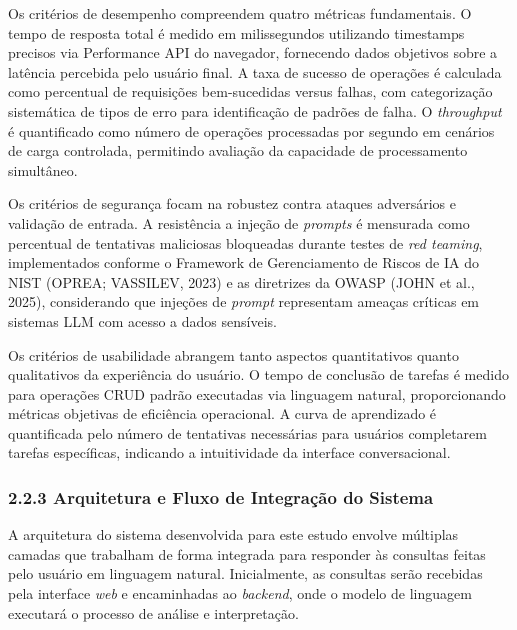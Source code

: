 \documentclass[
]{article}
\begin{document}
Os critérios de desempenho compreendem quatro métricas fundamentais. O
tempo de resposta total é medido em milissegundos utilizando timestamps
precisos via Performance API do navegador, fornecendo dados objetivos
sobre a latência percebida pelo usuário final. A taxa de sucesso de
operações é calculada como percentual de requisições bem-sucedidas
versus falhas, com categorização sistemática de tipos de erro para
identificação de padrões de falha. O \emph{throughput} é quantificado
como número de operações processadas por segundo em cenários de carga
controlada, permitindo avaliação da capacidade de processamento
simultâneo.

Os critérios de segurança focam na robustez contra ataques adversários e
validação de entrada. A resistência a injeção de \emph{prompts} é
mensurada como percentual de tentativas maliciosas bloqueadas durante
testes de \emph{red teaming}, implementados conforme o Framework de
Gerenciamento de Riscos de IA do NIST (OPREA; VASSILEV, 2023) e as
diretrizes da OWASP (JOHN et al., 2025), considerando que injeções de
\emph{prompt} representam ameaças críticas em sistemas LLM com acesso a
dados sensíveis.

Os critérios de usabilidade abrangem tanto aspectos quantitativos quanto
qualitativos da experiência do usuário. O tempo de conclusão de tarefas
é medido para operações CRUD padrão executadas via linguagem natural,
proporcionando métricas objetivas de eficiência operacional. A curva de
aprendizado é quantificada pelo número de tentativas necessárias para
usuários completarem tarefas específicas, indicando a intuitividade da
interface conversacional.

\subsubsection{2.2.3 Arquitetura e Fluxo de Integração do
Sistema}\label{arquitetura-e-fluxo-de-integrauxe7uxe3o-do-sistema}

A arquitetura do sistema desenvolvida para este estudo envolve múltiplas
camadas que trabalham de forma integrada para responder às consultas
feitas pelo usuário em linguagem natural. Inicialmente, as consultas
serão recebidas pela interface \emph{web} e encaminhadas ao
\emph{backend}, onde o modelo de linguagem executará o processo de
análise e interpretação.
\end{document}
